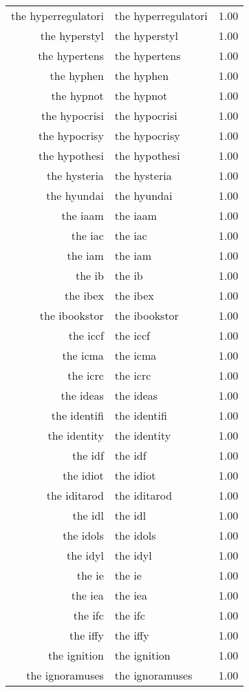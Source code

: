 \begin{table}[ht]
\begin{tabular}{rlr}
  the hyperregulatori & the hyperregulatori & 1.00 \\ 
  the hyperstyl & the hyperstyl & 1.00 \\ 
  the hypertens & the hypertens & 1.00 \\ 
  the hyphen & the hyphen & 1.00 \\ 
  the hypnot & the hypnot & 1.00 \\ 
  the hypocrisi & the hypocrisi & 1.00 \\ 
  the hypocrisy & the hypocrisy & 1.00 \\ 
  the hypothesi & the hypothesi & 1.00 \\ 
  the hysteria & the hysteria & 1.00 \\ 
  the hyundai & the hyundai & 1.00 \\ 
  the iaam & the iaam & 1.00 \\ 
  the iac & the iac & 1.00 \\ 
  the iam & the iam & 1.00 \\ 
  the ib & the ib & 1.00 \\ 
  the ibex & the ibex & 1.00 \\ 
  the ibookstor & the ibookstor & 1.00 \\ 
  the iccf & the iccf & 1.00 \\ 
  the icma & the icma & 1.00 \\ 
  the icrc & the icrc & 1.00 \\ 
  the ideas & the ideas & 1.00 \\ 
  the identifi & the identifi & 1.00 \\ 
  the identity & the identity & 1.00 \\ 
  the idf & the idf & 1.00 \\ 
  the idiot & the idiot & 1.00 \\ 
  the iditarod & the iditarod & 1.00 \\ 
  the idl & the idl & 1.00 \\ 
  the idols & the idols & 1.00 \\ 
  the idyl & the idyl & 1.00 \\ 
  the ie & the ie & 1.00 \\ 
  the iea & the iea & 1.00 \\ 
  the ifc & the ifc & 1.00 \\ 
  the iffy & the iffy & 1.00 \\ 
  the ignition & the ignition & 1.00 \\ 
  the ignoramuses & the ignoramuses & 1.00 \\ 

\end{tabular}
\end{table}
